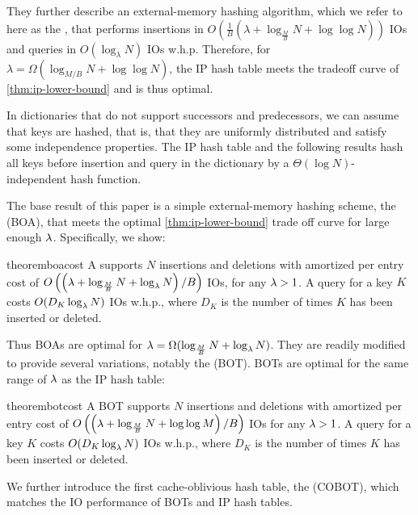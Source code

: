 They further describe an external-memory hashing algorithm, which we refer to
here as the , that performs insertions in
$O\left(\frac{1}{B}\left(\lambda + \log_{\frac{M}{B}} N + \log\log
N\right)\right)$ IOs and queries in $O(\log_\lambda N)$ IOs w.h.p. Therefore,
for $\lambda=\Omega\left(\log_{M/B}N + \log\log{N}\right)$, the IP hash table
meets the tradeoff curve of \cref{thm:ip-lower-bound} and is thus optimal.

In dictionaries that do not support successors and predecessors, we
can assume that keys are hashed, that is, that they are uniformly
distributed and satisfy some independence properties. The IP hash
table and the following results hash all keys before
insertion and query in the dictionary by a
$\Theta(\log N)$-independent hash function.

The base result of this paper is a simple external-memory
hashing scheme, the  (BOA),
that meets the optimal \cref{thm:ip-lower-bound} trade off curve for
large enough $\lambda$. Specifically, we show:

\begin{restatable}{theorem}{boacost}\label{thm:boa-cost}
	A \boa{} supports $N$ insertions and deletions with amortized
	per entry cost of $O\left(\left(\lambda + \log_{\frac{M}{B}} N +
	\log_\lambda{N} \right)/B\right)$ IOs, for any $\lambda > 1$. A query for a key
	$K$ costs $O(D_K\log_\lambda{N})$ IOs w.h.p., where $D_K$ is the number of times
	$K$ has been inserted or deleted.
\end{restatable}

Thus BOAs are optimal for $\lambda = \Omega(\log_{\frac{M}{B}} N +
\log_\lambda{N})$.  They are readily modified to provide several variations,
notably the  (BOT). BOTs are optimal for the
same range of $\lambda$ as the IP hash table:

\begin{restatable}{theorem}{botcost}\label{thm:bot-cost}
	A BOT supports $N$ insertions and deletions with amortized per entry cost
	of $O\left(\left(\lambda + \log_{\frac{M}{B}} N + \log\log M\right)/B\right)$
	IOs for any $\lambda > 1$.  A query for a key $K$ costs $O(D_K\log_\lambda{N})$
	IOs w.h.p., where $D_K$ is the number of times $K$ has been inserted or
	deleted.
\end{restatable}

We further introduce the first cache-oblivious hash table, the
 (COBOT), which matches the IO
performance of BOTs and IP hash tables.

